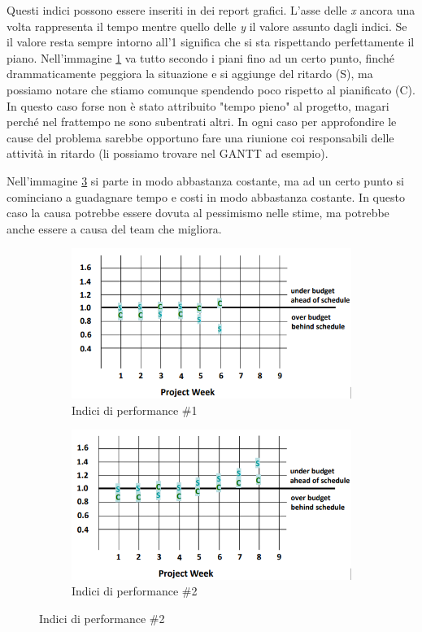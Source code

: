 \noindent Questi indici possono essere inseriti in dei report grafici. L'asse delle \textit{x} ancora una volta rappresenta il tempo mentre quello delle \textit{y} il valore assunto dagli indici. Se il valore resta sempre intorno all'1 significa che si sta rispettando perfettamente il piano. Nell'immagine \ref{perfind1} va tutto secondo i piani fino ad un certo punto, finché drammaticamente peggiora la situazione e si aggiunge del ritardo (S), ma possiamo notare che stiamo comunque spendendo poco rispetto al pianificato (C). In questo caso forse non è stato attribuito "tempo pieno" al progetto, magari perché nel frattempo ne sono subentrati altri. In ogni caso per approfondire le cause del problema sarebbe opportuno fare una riunione coi responsabili delle attività in ritardo (li possiamo trovare nel GANTT ad esempio).

\noindent Nell'immagine \ref{perfind2} si parte in modo abbastanza costante, ma ad un certo punto si cominciano a guadagnare tempo e costi in modo abbastanza costante. In questo caso la causa potrebbe essere dovuta al pessimismo nelle stime, ma potrebbe anche essere a causa del team che migliora.

\begin{figure}[H]
	\centering
	\begin{subfigure}[b]{0.45\textwidth}
		\centering
		\includegraphics[width=\textwidth]{document/img/performance-indices-1.png}
		\caption{Indici di performance \#1}
		\label{perfind1}
	\end{subfigure}
	\hfill
	\begin{subfigure}[b]{0.45\textwidth}
		\centering
		\includegraphics[width=\textwidth]{document/img/performance-indices-2.png}
		\caption{Indici di performance \#2}
		\label{perfind2}
	\end{subfigure}
\end{figure}

